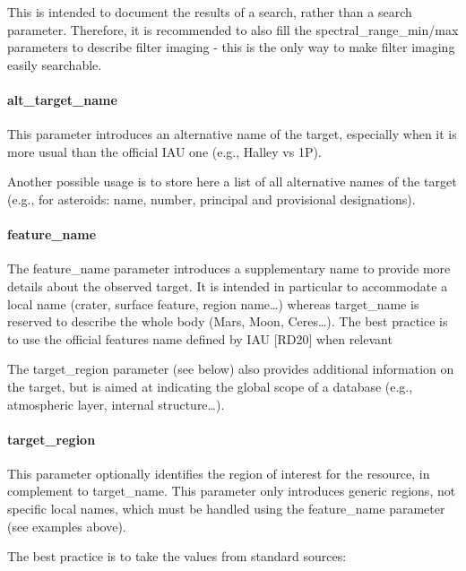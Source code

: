 \documentclass[11pt,a4paper]{ivoa}
\begin{document}
This is intended to document the results of a search, rather than a search parameter. Therefore, it is recommended to also fill the spectral\_range\_min/max parameters to describe filter imaging - this is the only way to make filter imaging easily searchable.

\paragraph{alt\_target\_name}

This parameter introduces an alternative name of the target, especially when it is more usual than the official IAU one (e.g., Halley vs 1P).

Another possible usage is to store here a list of all alternative names of the target (e.g., for asteroids: name, number, principal and provisional designations).

\paragraph{feature\_name}

The feature\_name parameter introduces a supplementary name to provide more details about the observed target. It is intended in particular to accommodate a local name (crater, surface feature, region name…) whereas target\_name is reserved to describe the whole body (Mars, Moon, Ceres…). The best practice is to use the official features name defined by IAU [RD20] when relevant

The target\_region parameter (see below) also provides additional information on the target, but is aimed at indicating the global scope of a database (e.g., atmospheric layer, internal structure…).

\paragraph{target\_region}

This parameter optionally identifies the region of interest for the resource, in complement to target\_name. This parameter only introduces generic regions, not specific local names, which must be handled using the feature\_name parameter (see examples above).

The best practice is to take the values from standard sources:
\end{document}
